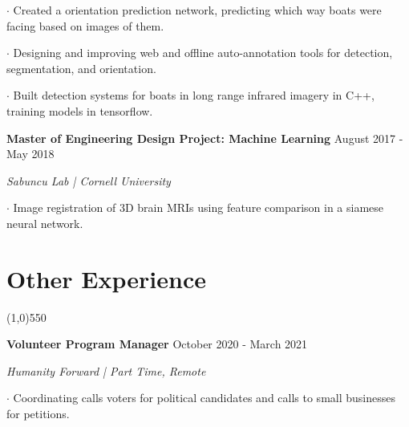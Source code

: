 \documentclass[11pt]{article} %
\begin{document}
		$\boldsymbol{\cdot}$ Created a orientation prediction network, predicting which way boats were facing based on images of them. \par \vspace{+1ex}
		$\boldsymbol{\cdot}$ Designing and improving web and offline auto-annotation tools for detection, segmentation, and orientation.\par \vspace{+1ex}
		$\boldsymbol{\cdot}$ Built detection systems for boats in long range infrared imagery in C++, training models in tensorflow. \par \vspace{+1ex}
    \vspace{+0ex}
    \textbf{\large Master of Engineering Design Project: Machine Learning} \hfill August 2017 - May 2018 \vspace{-0ex}
	\setlength{\parindent}{-0ex} \par
		\textit{Sabuncu Lab | Cornell University}\vspace{+1ex} \par
		$\boldsymbol{\cdot}$ Image registration of 3D brain MRIs using feature comparison in a siamese neural network. \par \vspace{+3ex}
	\setlength{\itemindent}{0in}
	\vspace{-5ex}
		\section*{Other Experience}
	\vspace{-7ex}
	\begin{center}
    \line(1,0){550}
    \end{center}
	\vspace{-1ex}
        \textbf{\large Volunteer Program Manager} \hfill October 2020 - March 2021
    \setlength{\parindent}{-0ex} \par
    \textit{Humanity Forward | Part Time, Remote} \vspace{+1ex} \par
    $\boldsymbol{\cdot}$ Coordinating calls voters for political candidates and calls to small businesses for petitions. \par \vspace{+1ex}
	\vspace{-3ex}
\end{document}
